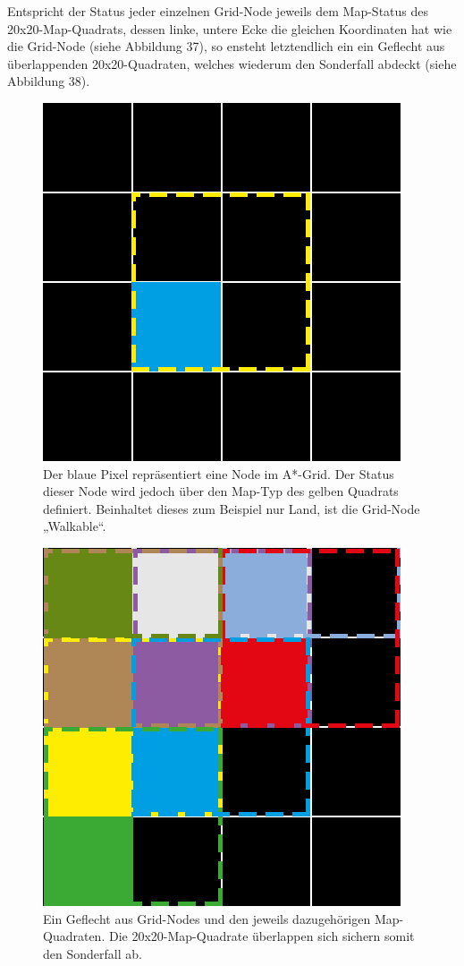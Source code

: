 \documentclass[a4paper,12pt]{article}
\begin{document}
Entspricht der Status jeder einzelnen Grid-Node jeweils dem Map-Status des 20x20-Map-Quadrats, dessen linke, untere Ecke die gleichen Koordinaten hat wie die Grid-Node (siehe Abbildung 37), so ensteht letztendlich ein ein Geflecht aus überlappenden 20x20-Quadraten, welches wiederum den Sonderfall abdeckt (siehe Abbildung 38).

\begin{figure}[H]
\centering
    \includegraphics[width=.8\linewidth]{Bilder/Aufgabe3/Teilaufgabe_A/AStar_Grid.png}
    \caption{Der blaue Pixel repräsentiert eine Node im A*-Grid. Der Status dieser Node wird jedoch über den Map-Typ des gelben Quadrats definiert. Beinhaltet dieses zum Beispiel nur Land, ist die Grid-Node „Walkable“.}
\end{figure}

\begin{figure}[H]
\centering
    \includegraphics[width=.8\linewidth]{Bilder/Aufgabe3/Teilaufgabe_A/AStar_Grid_02.png}
    \caption{Ein Geflecht aus Grid-Nodes und den jeweils dazugehörigen Map-Quadraten. Die 20x20-Map-Quadrate überlappen sich sichern somit den Sonderfall ab.}
\end{figure}
\end{document}
